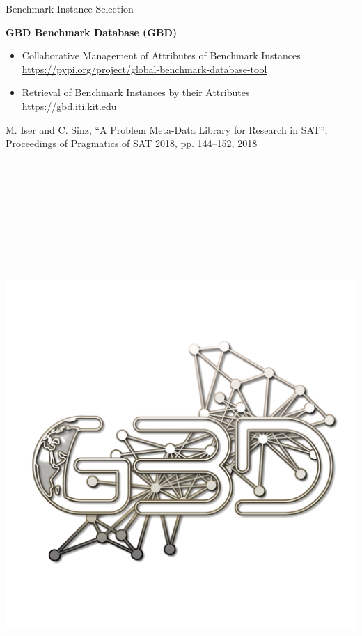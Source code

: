 \documentclass{beamer}
\begin{document}
\begin{frame}{Benchmark Instance Selection}

\textbf{GBD Benchmark Database (GBD)}

\begin{itemize}
\item Collaborative Management of Attributes of Benchmark Instances\\[.2em]
\url{https://pypi.org/project/global-benchmark-database-tool}\\[1em]
\item Retrieval of Benchmark Instances by their Attributes\\[.2em]
\url{https://gbd.iti.kit.edu}\\[1em]
\end{itemize}%
%
\parbox{.7\linewidth}{
\begin{thebibliography}{00}%
\tiny
{}
M. Iser and C. Sinz, ``A Problem Meta-Data Library for Research in {SAT}'',
Proceedings of Pragmatics of {SAT} 2018, pp. 144--152, 2018
\end{thebibliography}
~\\~\\~\\~\\~\\~\\
}
\hfill
\parbox{.29\linewidth}{
~\\~\\
\includegraphics[width=\linewidth]{gbd_logo.png}
}

\end{frame}
\end{document}
